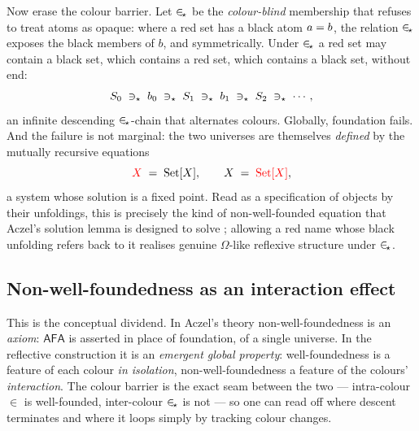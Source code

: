 Now erase the colour barrier. Let $\mathrel{\in_{\!\star}}$ be the \emph{colour-blind} membership
that refuses to treat atoms as opaque: where a red set has a black atom
$a=\textcolor{black}{b}$, the relation $\mathrel{\in_{\!\star}}$ exposes the black members of $b$, and
symmetrically. Under $\mathrel{\in_{\!\star}}$ a red set may contain a black set, which contains a
red set, which contains a black set, without end:
\[
  S_0 \;\ni_\star\; \textcolor{black}{b_0} \;\ni_\star\; S_1 \;\ni_\star\; \textcolor{black}{b_1}
  \;\ni_\star\; S_2 \;\ni_\star\; \cdots,
\]
an infinite descending $\mathrel{\in_{\!\star}}$-chain that alternates colours. Globally,
foundation fails. And the failure is not marginal: the two universes are
themselves \emph{defined} by the mutually recursive equations
\[
  \textcolor{red}{X} \;=\; \textcolor{black}{\mathrm{Set}[X]}, \qquad \textcolor{black}{X} \;=\; \textcolor{red}{\mathrm{Set}[X]},
\]
a system whose solution is a fixed point. Read as a specification of objects by
their unfoldings, this is precisely the kind of non-well-founded equation that
Aczel's solution lemma is designed to solve \cite{aczel1988nwf}; allowing a red
name whose black unfolding refers back to it realises genuine $\Omega$-like
reflexive structure under $\mathrel{\in_{\!\star}}$.

\subsection{Non-well-foundedness as an interaction effect}
\label{sec:nwf:interaction}

This is the conceptual dividend. In Aczel's theory non-well-foundedness is an
\emph{axiom}: $\mathsf{AFA}$ is asserted in place of foundation, of a single
universe. In the reflective construction it is an \emph{emergent global
property}: well-foundedness is a feature of each colour \emph{in isolation},
non-well-foundedness a feature of the colours' \emph{interaction}. The colour
barrier is the exact seam between the two --- intra-colour $\in$ is well-founded,
inter-colour $\mathrel{\in_{\!\star}}$ is not --- so one can read off where descent terminates and
where it loops simply by tracking colour changes.

